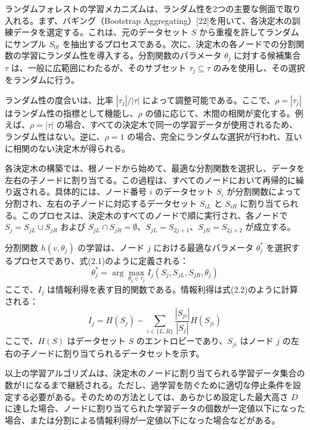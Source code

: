 \documentclass[platex]{suribt}
\begin{document}
ランダムフォレストの学習メカニズムは、ランダム性を2つの主要な側面で取り入れる。まず、バギング（Bootstrap Aggregating）[22]を用いて、各決定木の訓練データを選定する。これは、元のデータセット \(S\) から重複を許してランダムにサンプル \(S_{0t}\) を抽出するプロセスである。次に、決定木の各ノードでの分割関数の学習にランダム性を導入する。分割関数のパラメータ \(\theta_j\) に対する候補集合 \(\tau\) は、一般に広範囲にわたるが、そのサブセット \(\tau_j \subseteq \tau\) のみを使用し、その選択をランダムに行う。

ランダム性の度合いは、比率 \(|\tau_j| / |\tau|\) によって調整可能である。ここで、\(\rho = |\tau_j|\) はランダム性の指標として機能し、\(\rho\) の値に応じて、木間の相関が変化する。例えば、\(\rho = |\tau|\) の場合、すべての決定木で同一の学習データが使用されるため、ランダム性はない。逆に、\(\rho = 1\) の場合、完全にランダムな選択が行われ、互いに相関のない決定木が得られる。

各決定木の構築では、根ノードから始めて、最適な分割関数を選択し、データを左右の子ノードに割り当てる。この過程は、すべてのノードにおいて再帰的に繰り返される。具体的には、ノード番号 \(i\) のデータセット \(S_i\) が分割関数によって分割され、左右の子ノードに対応するデータセット \(S_{iL}\) と \(S_{iR}\) に割り当てられる。このプロセスは、決定木のすべてのノードで順に実行され、各ノードで \(S_j = S_{jL} \cup S_{jR}\) および \(S_{jL} \cap S_{jR} = \emptyset\)、\(S_{jL} = S_{2j+1}\)、\(S_{jR} = S_{2j+2}\) が成立する。

分割関数 \(h(v, \theta_j)\) の学習は、ノード \(j\) における最適なパラメータ \(\theta_j^*\) を選択するプロセスであり、式(2.1)のように定義される：
\begin{equation}
\theta_j^* = \arg \max_{\theta_j \in \tau_j} I_j(S_j, S_{jL}, S_{jR}, \theta_j)
\end{equation}
ここで、\(I_j\) は情報利得を表す目的関数である。情報利得は式(2.2)のように計算される：
\begin{equation}
I_j = H(S_j) - \sum_{i \in \{L, R\}} \frac{|S_{ji}|}{|S_j|} H(S_{ji})
\end{equation}
ここで、\(H(S)\) はデータセット \(S\) のエントロピーであり、\(S_{ji}\) はノード \(j\) の左右の子ノードに割り当てられるデータセットを示す。

以上の学習アルゴリズムは、決定木のノードに割り当てられる学習データ集合の数が1になるまで継続される。ただし、過学習を防ぐために適切な停止条件を設定する必要がある。そのための方法としては、あらかじめ設定した最大高さ \(D\) に達した場合、ノードに割り当てられた学習データの個数が一定値以下になった場合、または分割による情報利得が一定値以下になった場合などがある。
\end{document}
